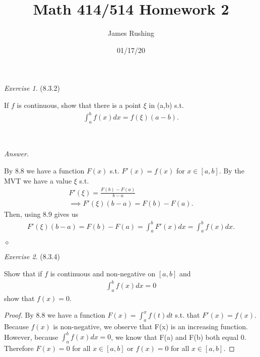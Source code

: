 \documentclass[12pt,oneside]{amsart}
\title{Math 414/514 Homework 2}
\author{James Rushing}
\date{01/17/20}
\theoremstyle{definition}
\theoremstyle{remark}
\newtheorem{exer}{Exercise}
\numberwithin{equation}{exer}
\newenvironment{answer}{\bigskip\noindent\emph{Answer.}}{\hfill$\diamond$\newline}
\begin{document}
\maketitle

\begin{exer} (8.3.2)

If $f$ is continuous, show that there is a point $\xi$ in (a,b) s.t. 
\begin{align*}
    \int_a^bf(x)dx = f(\xi)(a-b).
\end{align*}

\end{exer}



\




\begin{answer}

By 8.8 we have a function $F(x)$ s.t. $F'(x)=f(x)$ for $x\in[a,b]$. By the MVT we have a value $\xi$ s.t.
\begin{align*}
    F'(\xi)=\frac{F(b)-F(a)}{b-a}\\
    \implies F'(\xi)(b-a)=F(b)-F(a).
\end{align*}
Then, using 8.9 gives us
\begin{align*}
    F'(\xi)(b-a)=F(b)-F(a)=\int_a^bF'(x)dx=\int_a^bf(x)dx.
\end{align*}

\end{answer}


\newpage



\begin{exer} (8.3.4)

Show that if $f$ is continuous and non-negative on $[a,b]$ and 
\begin{align*}
    \int_a^bf(x)dx=0
\end{align*}
show that $f(x)=0$.
\end{exer}


\begin{proof}

By 8.8 we have a function $F(x)=\int_a^xf(t)dt$ s.t. that $F'(x)=f(x)$. Because $f(x)$ is non-negative, we observe that F(x) is an increasing function. However, because $\int_a^bf(x)dx=0$, we know that F(a) and F(b) both equal 0. Therefore $F(x)=0$ for all $x\in [a,b]$ or $f(x)=0$ for all $x\in [a,b]$.



  

\end{proof}
\end{document}

